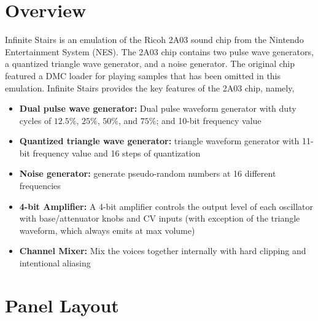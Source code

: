 \documentclass[12pt,letter]{article}
\begin{document}


\section*{Overview}

Infinite Stairs is an emulation of the Ricoh 2A03 sound chip from the Nintendo Entertainment System (NES). The 2A03 chip contains two pulse wave generators, a quantized triangle wave generator, and a noise generator. The original chip featured a DMC loader for playing samples that has been omitted in this emulation. Infinite Stairs provides the key features of the 2A03 chip, namely,
\begin{itemize}
  \item \textbf{Dual pulse wave generator:} Dual pulse waveform generator with duty cycles of $12.5\%$, $25\%$, $50\%$, and $75\%$; and 10-bit frequency value
  \item \textbf{Quantized triangle wave generator:} triangle waveform generator with 11-bit frequency value and 16 steps of quantization
  \item \textbf{Noise generator:} generate pseudo-random numbers at 16 different frequencies
  \item \textbf{4-bit Amplifier:} A 4-bit amplifier controls the output level of each oscillator with base/attenuator knobs and CV inputs (with exception of the triangle waveform, which always emits at max volume)
  \item \textbf{Channel Mixer:} Mix the voices together internally with hard clipping and intentional aliasing
\end{itemize}


\clearpage
\section*{Panel Layout}
\end{document}
